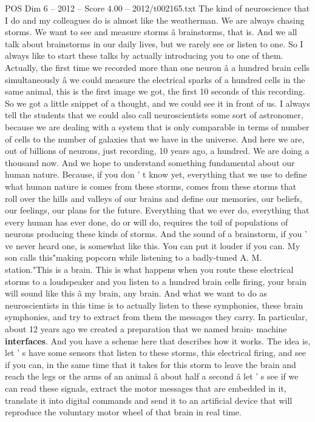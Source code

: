 \begin{textsample}{POS Dim 6 – 2012 – Score 4.00 – 2012/t002165.txt}  \label{ex:f6_pos_043}
The kind of neuroscience that I do and my colleagues do is almost like the weatherman.
We are always chasing storms.
We want to see and measure storms â brainstorms, that is.
And we all talk about brainstorms in our daily lives, but we rarely see or listen to one.
So I always like to start these talks by actually introducing you to one of them.
Actually, the first time we recorded more than one neuron â a hundred brain cells simultaneously â we could measure the electrical sparks of a hundred cells in the same animal, this is the first image we got, the first 10 seconds of this recording.
So we got a little snippet of a thought, and we could see it in front of us.
I always tell the students that we could also call neuroscientists some sort of astronomer, because we are dealing with a system that is only comparable in terms of number of cells to the number of galaxies that we have in the universe.
And here we are, out of billions of neurons, just recording, 10 years ago, a hundred.
We are doing a thousand now.
And we hope to understand something fundamental about our human nature.
Because, if you don ' t know yet, everything that we use to define what human nature is comes from these storms, comes from these storms that roll over the hills and valleys of our brains and define our memories, our beliefs, our feelings, our plans for the future.
Everything that we ever do, everything that every human has ever done, do or will do, requires the toil of populations of neurons producing these kinds of storms.
And the sound of a brainstorm, if you ' ve never heard one, is somewhat like this.
You can put it louder if you can.
My son calls this"making popcorn while listening to a badly-tuned A.
M. station."This is a brain.
This is what happens when you route these electrical storms to a loudspeaker and you listen to a hundred brain cells firing, your brain will sound like this â my brain, any brain.
And what we want to do as neuroscientists in this time is to actually listen to these symphonies, these brain symphonies, and try to extract from them the messages they carry.
In particular, about 12 years ago we created a preparation that we named brain- machine \textbf{interfaces}.
And you have a scheme here that describes how it works.
The idea is, let ' s have some sensors that listen to these storms, this electrical firing, and see if you can, in the same time that it takes for this storm to leave the brain and reach the legs or the arms of an animal â about half a second â let ' s see if we can read these signals, extract the motor messages that are embedded in it, translate it into digital commands and send it to an artificial device that will reproduce the voluntary motor wheel of that brain in real time.

\end{textsample}
